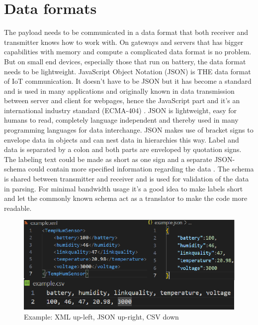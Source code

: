 \documentclass[article,a4paper]{IEEEtran}
\begin{document}
\section{Data formats}  
The payload needs to be communicated in a data format that both receiver and transmitter knows how to work with. On gateways and servers that has bigger capabilities with memory and compute a complicated data format is no problem. But on small end devices, especially those that run on battery, the data format needs to be lightweight.
\newline\newline      
JavaScript Object Notation (JSON) is THE data format of IoT communication. It doesn't have to be JSON but it has become a standard and is used in many applications and originally known in data transmission between server and client for webpages, hence the JavaScript part and it's an international industry standard (ECMA-404) \cite{JSONstandard}. JSON is lightweight, easy for humans to read, completely language independent and thereby used in many programming languages for data interchange\cite{JSONintro}. JSON makes use of bracket signs to envelope data in objects and can nest data in hierarchies this way. Label and data is separated by a colon and both parts are enveloped by quotation signs. The labeling text could be made as short as one sign and a separate JSON-schema could contain more specified information regarding the data \cite{JSONformat}. The schema is shared between transmitter and receiver and is used for validation of the data in parsing. For minimal bandwidth usage it's a good idea to make labels short and let the commonly known schema act as a translator to make the code more readable.
\begin{figure}
    \includegraphics[width=\columnwidth]{JSON-XML-CSV.png} 
    \caption{ Example: XML up-left, JSON up-right, CSV down }
    \label{fig1:XML and JSON example}   
\end{figure}   
\newline\newline
\end{document}
